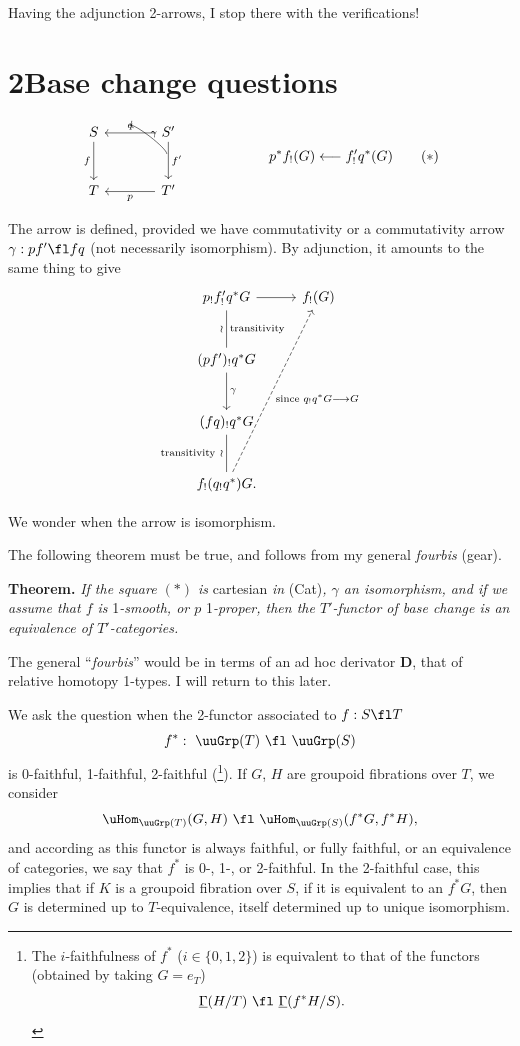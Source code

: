 Having the adjunction 2-arrows, I stop there with the verifications!


\section*{2\quad Base change questions}

\[
\begin{tikzcd}[column sep=large, row sep=large]
S & S' \arrow[l, "q"'] \arrow[d, "f'"] \\
T \arrow[from=1-1, "f"'] & T' \arrow[l, "p"]
\arrow[from=2-2, to=1-1, bend right=50, shorten <=18pt, shorten >=18pt, "\gamma"']
\end{tikzcd}
\qquad\qquad\qquad
p^*f_!(G) \longleftarrow f'_!q^*(G)
\tag*{$(*)$}
\]

The arrow is defined, provided we have commutativity or a commutativity arrow $\gamma : pf' \fl fq$ (not necessarily isomorphism). By adjunction, it amounts to the same thing to give
\[
\begin{tikzcd}[row sep=large]
p_!f'_!q^*G \arrow[r] \arrow[d, dash, "\wr"', "\text{transitivity}"] & f_!(G) \\
(pf')_!q^*G \arrow[d, "\gamma"] & \\
(fq)_!q^*G \arrow[d, dash, "\text{transitivity}\ \wr"'] & \\
f_!(q_!q^*)G. \arrow[uuur, dashed, "\text{since } q_!q^*G \longrightarrow G"'] &
\end{tikzcd}
\]

We wonder when the arrow is isomorphism.

The following theorem must be true, and follows from my general \textit{fourbis} (gear).

\textbf{Theorem.} \textit{If the square $(*)$ is} cartesian \textit{in} (Cat)\textit{, $\gamma$ an isomorphism, and if we assume that $f$ is} 1\textit{-smooth, or $p$} 1\textit{-proper, then the $T'$-functor of base change is an equivalence of $T'$-categories.}

The general ``\textit{fourbis}'' would be in terms of an ad hoc derivator $\mathbf{D}$, that of relative homotopy 1-types. I will return to this later.

We ask the question when the 2-functor associated to $f : S \fl T$
\[
f^* :\ \uuGrp(T) \ \fl\ \uuGrp(S)
\]
is 0-faithful, 1-faithful, 2-faithful (\footnote[2]{The $i$-faithfulness of $f^*$ ($i \in \{0,1,2\}$) is equivalent to that of the functors (obtained by taking $G = e_T$)
\[
\underline{\Gamma}(H/T) \ \fl\ \underline{\Gamma}(f^*H/S).
\]}). If $G$, $H$ are groupoid fibrations over $T$, we consider
\[
\uHom_{\uuGrp(T)}(G,H) \ \fl\ \uHom_{\uuGrp(S)}(f^*G, f^*H),
\]
and according as this functor is always faithful, or fully faithful, or an equivalence of categories, we say that $f^*$ is 0-, 1-, or 2-faithful. In the 2-faithful case, this implies that if $K$ is a groupoid fibration over $S$, if it is equivalent to an $f^*G$, then $G$ is determined up to $T$-equivalence, itself determined up to unique isomorphism.

